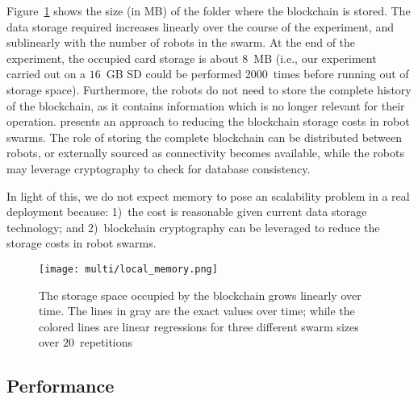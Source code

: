 \documentclass[runningheads]{llncs}
\begin{document}
Figure~\ref{fig:data-storage} shows the size (in MB) of the folder where the blockchain is stored. The data storage required increases linearly over the course of the experiment, and sublinearly with the number of robots in the swarm. At the end of the experiment, the occupied card storage is about $8$~MB (i.e., our experiment carried out on a $16$~GB SD could be performed $2000$~times before running out of storage space). Furthermore, the robots do not need to store the complete history of the blockchain, as it contains information which is no longer relevant for their operation. \cite{nishida_suppressing_2018} presents an approach to reducing the blockchain storage costs in robot swarms. The role of storing the complete blockchain can be distributed between robots, or externally sourced as connectivity becomes available, while the robots may leverage cryptography to check for database consistency.

In light of this, we do not expect memory to pose an scalability problem in a real deployment because: 1)~the cost is reasonable given current data storage technology; and 2)~blockchain cryptography can be leveraged to reduce the storage costs in robot swarms.

\begin{figure}
  \centering
  \texttt{[image: multi/local\_memory.png]}
  \caption{The storage space occupied by the blockchain grows linearly over time. The lines in gray are the exact values over time; while the colored lines are linear regressions for three different swarm sizes over $20$~repetitions} 
  \label{fig:data-storage}
\end{figure}



\subsection{Performance}
\label{subsec:performance}
\end{document}
